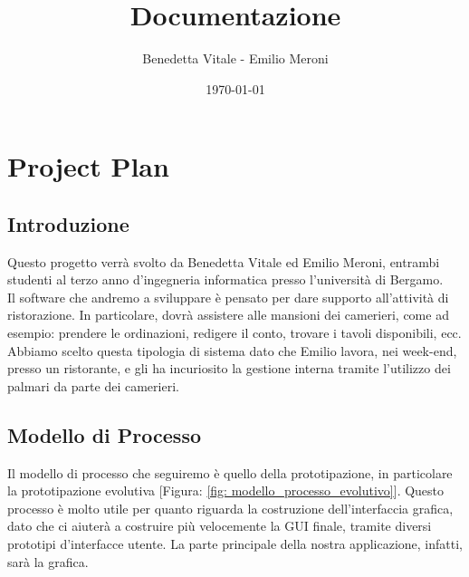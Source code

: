 \documentclass[12pt, letterpaper]{book}
\title{Documentazione}
\author{Benedetta Vitale - Emilio Meroni}
\date{\today}
\begin{document}
\maketitle

\tableofcontents    

\chapter{Project Plan}

\section{Introduzione}

    Questo progetto verrà svolto da Benedetta Vitale ed Emilio Meroni, entrambi studenti al terzo anno d'ingegneria informatica presso l'università di Bergamo.\\

    Il software che andremo a sviluppare è pensato per dare supporto 
    all'attività di ristorazione. In particolare, dovrà assistere alle mansioni dei camerieri, come ad esempio: prendere le ordinazioni, redigere il conto, trovare i tavoli disponibili, ecc.\\

    Abbiamo scelto questa tipologia di sistema dato che Emilio lavora, nei week-end, presso un ristorante, e gli ha incuriosito la gestione interna tramite l'utilizzo dei palmari da parte dei camerieri. 
    \begin{tabbing}
    
    \end{tabbing}
    
\section{Modello di Processo}

    Il modello di processo che seguiremo è quello della prototipazione, in particolare la prototipazione evolutiva [Figura: \ref{fig: modello_processo_evolutivo}]. Questo processo è molto utile per quanto riguarda la costruzione dell'interfaccia grafica, dato che ci aiuterà a costruire più velocemente la GUI finale, tramite diversi prototipi d'interfacce utente. La parte principale della nostra applicazione, infatti, sarà la grafica.
\end{document}
